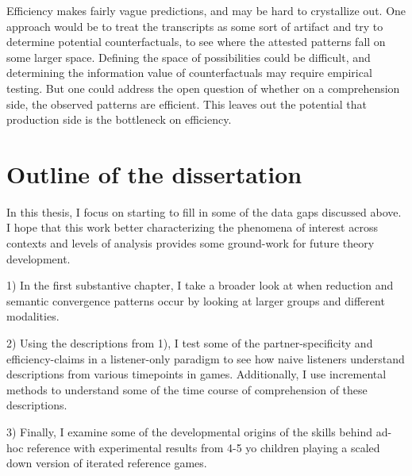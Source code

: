 \documentclass[]{article}
\begin{document}
	Efficiency makes fairly vague predictions, and may be hard to crystallize out. One approach would be to treat the transcripts as some sort of artifact and try to determine potential counterfactuals, to see where the attested patterns fall on some larger space. Defining the space of possibilities could be difficult, and determining the information value of counterfactuals may require empirical testing. But one could address the open question of whether on a comprehension side, the observed patterns are efficient. This leaves out the potential that production side is the bottleneck on efficiency.  
	
	
	\section{Outline of the dissertation}
	
	In this thesis, I focus on starting to fill in some of the data gaps discussed above. I hope that this work better characterizing the phenomena of interest across contexts and levels of analysis provides some ground-work for future theory development. 

	1) In the first substantive chapter, I take a broader look at when reduction and semantic convergence patterns occur by looking at larger groups and different modalities. 
	
	
	2) Using the descriptions from 1), I test some of the partner-specificity and efficiency-claims in a listener-only paradigm to see how naive listeners understand descriptions from various timepoints in games. Additionally, I use incremental methods to understand some of the time course of comprehension of these descriptions. 
	
	3) Finally, I examine some of the developmental origins of the skills behind ad-hoc reference with experimental results from 4-5 yo children playing a scaled down version of iterated reference games. 
\end{document}
